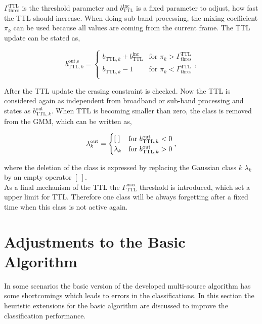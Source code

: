 $\Gamma^\text{TTL}_\text{thres}$ is the threshold parameter and $ b_{\text{TTL}}^\text{inc}$ is a fixed parameter to adjust, how fast the \ac{TTL} should increase. When doing sub-band processing, the mixing coefficient $\pi_k$ can be used because all values are coming from the current frame. The \ac{TTL} update can be stated as,

\begin{equation}
b_{\text{TTL},k}^{\text{out,s}} =
	\begin{cases}
	    b_{\text{TTL},k} + b_{\text{TTL}}^\text{inc}	  				& \text{for } \pi_k > \Gamma^\text{TTL}_\text{thres}\\
	    b_{\text{TTL},k} - 1 	& \text{for } \pi_k < \Gamma^\text{TTL}_\text{thres}\\
	\end{cases},
	\label{eq:ttl_add_sub}
\end{equation}

After the \ac{TTL} update the erasing constraint is checked. Now the \ac{TTL} is considered again as independent from broadband or sub-band processing and states as $b_{\text{TTL},k}^{\text{out}}$. When \ac{TTL} is becoming smaller than zero, the class is removed from the \ac{GMM}, which can be written as,

\begin{equation}
\lambda_k^{\text{out}} =
	\begin{cases}
	    [\ ] 	& \text{for } b_{\text{TTL},k}^{\text{out}} < 0\\
	    \lambda_k	& \text{for } b_{\text{TTL},k}^{\text{out}} > 0\\
	\end{cases}\\[1em],
\end{equation}

where the deletion of the class is expressed by replacing the Gaussian class $k$ $\lambda_k$ by an empty operator $[\ ]$.\\
As a final mechanism of the \ac{TTL} the $\Gamma_\text{TTL}^\text{max}$ threshold is introduced, which set a upper limit for \ac{TTL}. Therefore one class will be always forgetting after a fixed time when this class is not active again.

\section{Adjustments to the Basic Algorithm}

In some scenarios the basic version of the developed multi-source algorithm has some shortcomings which leads to errors in the classifications. In this section the heuristic extensions for the basic algorithm are discussed to improve the classification performance.


